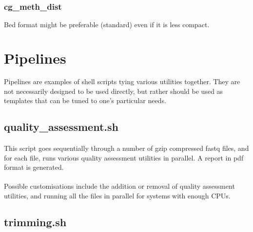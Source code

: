 \documentclass[a4paper,12pt]{article}
\begin{document}
\subsubsection{cg\_meth\_dist}

Bed format might be preferable (standard) even if it is less compact.


\section{Pipelines}

\label{pipelines}

Pipelines are examples of shell scripts tying various utilities together.
They are not necessarily designed to be used directly, but rather should be
used as templates that can be tuned to one's particular needs.


\subsection{quality\_assessment.sh}

\paragraph{}
This script goes sequentially through a number of gzip compressed fastq files,
and for each file, runs various quality assessment utilities in parallel.
A report in pdf format is generated.

\paragraph{}
Possible customisations include the addition or removal of quality assessment
utilities, and running all the files in parallel for systems with enough CPUs.


\subsection{trimming.sh}
\end{document}

